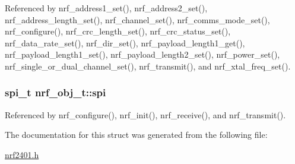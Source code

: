 Referenced by nrf\_\-address1\_\-set(), nrf\_\-address2\_\-set(), nrf\_\-address\_\-length\_\-set(), nrf\_\-channel\_\-set(), nrf\_\-comms\_\-mode\_\-set(), nrf\_\-configure(), nrf\_\-crc\_\-length\_\-set(), nrf\_\-crc\_\-status\_\-set(), nrf\_\-data\_\-rate\_\-set(), nrf\_\-dir\_\-set(), nrf\_\-payload\_\-length1\_\-get(), nrf\_\-payload\_\-length1\_\-set(), nrf\_\-payload\_\-length2\_\-set(), nrf\_\-power\_\-set(), nrf\_\-single\_\-or\_\-dual\_\-channel\_\-set(), nrf\_\-transmit(), and nrf\_\-xtal\_\-freq\_\-set().\hypertarget{structnrf__obj__t_68e34d6c3812594732d7e4edce10053e}{
\subsubsection{\setlength{\rightskip}{0pt plus 5cm}spi\_\-t {\bf nrf\_\-obj\_\-t::spi}}}
\label{structnrf__obj__t_68e34d6c3812594732d7e4edce10053e}




Referenced by nrf\_\-configure(), nrf\_\-init(), nrf\_\-receive(), and nrf\_\-transmit().

The documentation for this struct was generated from the following file:\begin{CompactItemize}
\item 
\hyperlink{nrf2401_8h}{nrf2401.h}\end{CompactItemize}
